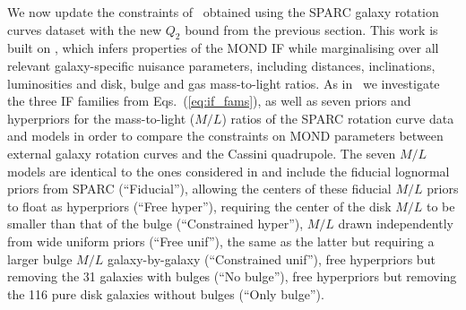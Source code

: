 \documentclass[reprint,nofootinbib,prd,aps]{revtex4-2}
\begin{document}
We now update the constraints of~\cite{Desmond_Cassini} obtained using the SPARC galaxy rotation curves dataset \cite{lelli:2016} with the new $Q_2$ bound from the previous section. This work is built on \cite{uRAR}, which infers properties of the MOND IF while marginalising over all relevant galaxy-specific nuisance parameters, including distances, inclinations, luminosities and disk, bulge and gas mass-to-light ratios. As in~\cite{Desmond_Cassini} we investigate the three IF families from Eqs.~(\ref{eq:if_fams}), as well as seven priors and hyperpriors for the mass-to-light ($M/L$) ratios of the SPARC \cite{SPARC} rotation curve data and models in order to compare the constraints on MOND parameters between external galaxy rotation curves and the Cassini quadrupole. The seven $M/L$ models are identical to the ones considered in \cite{Desmond_Cassini} and include the fiducial lognormal priors from SPARC (``Fiducial''), allowing the centers of these fiducial $M/L$ priors to float as hyperpriors (``Free hyper''), requiring the center of the disk $M/L$ to be smaller than that of the bulge (``Constrained hyper''), $M/L$ drawn independently from wide uniform priors (``Free unif''), the same as the latter but requiring a larger bulge $M/L$ galaxy-by-galaxy (``Constrained unif''), free hyperpriors but removing the 31 galaxies with bulges (``No bulge''), free hyperpriors but removing the 116 pure disk galaxies without bulges (``Only bulge''). 
\end{document}
